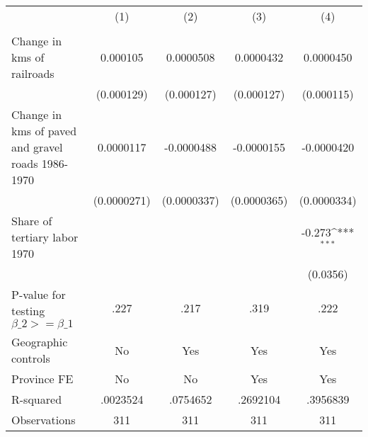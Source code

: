 {
\def\sym#1{\ifmmode^{#1}\else\(^{#1}\)\fi}
\begin{tabular}{l*{4}{c}}
\hline\hline
                &\multicolumn{1}{c}{(1)}&\multicolumn{1}{c}{(2)}&\multicolumn{1}{c}{(3)}&\multicolumn{1}{c}{(4)}\\
                &\multicolumn{1}{c}{}&\multicolumn{1}{c}{}&\multicolumn{1}{c}{}&\multicolumn{1}{c}{}\\
\hline
Change in kms of railroads& 0.000105         &0.0000508         &0.0000432         &0.0000450         \\
                &(0.000129)         &(0.000127)         &(0.000127)         &(0.000115)         \\
[1em]
Change in kms of paved and gravel roads 1986-1970&0.0000117         &-0.0000488         &-0.0000155         &-0.0000420         \\
                &(0.0000271)         &(0.0000337)         &(0.0000365)         &(0.0000334)         \\
[1em]
Share of tertiary labor 1970&                  &                  &                  &   -0.273\sym{***}\\
                &                  &                  &                  & (0.0356)         \\
\hline
P-value for testing $\beta\_{2} >= \beta\_{1}$&     .227         &     .217         &     .319         &     .222         \\
Geographic controls&       No         &      Yes         &      Yes         &      Yes         \\
Province FE     &       No         &       No         &      Yes         &      Yes         \\
R-squared       & .0023524         & .0754652         & .2692104         & .3956839         \\
Observations    &      311         &      311         &      311         &      311         \\
\hline\hline
\end{tabular}
}
